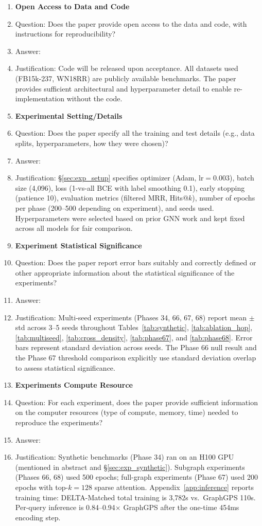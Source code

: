 \documentclass{article}
\begin{document}
\begin{enumerate}
\item {\bf Open Access to Data and Code}
\item[] Question: Does the paper provide open access to the data and code, with instructions for reproducibility?
\item[] Answer: \answerNo{}
\item[] Justification: Code will be released upon acceptance. All datasets used (FB15k-237, WN18RR) are publicly available benchmarks. The paper provides sufficient architectural and hyperparameter detail to enable re-implementation without the code.

\item {\bf Experimental Setting/Details}
\item[] Question: Does the paper specify all the training and test details (e.g., data splits, hyperparameters, how they were chosen)?
\item[] Answer: \answerYes{}
\item[] Justification: \S\ref{sec:exp_setup} specifies optimizer (Adam, $\text{lr}{=}0.003$), batch size (4,096), loss (1-vs-all BCE with label smoothing 0.1), early stopping (patience 10), evaluation metrics (filtered MRR, Hits@$k$), number of epochs per phase (200--500 depending on experiment), and seeds used. Hyperparameters were selected based on prior GNN work and kept fixed across all models for fair comparison.

\item {\bf Experiment Statistical Significance}
\item[] Question: Does the paper report error bars suitably and correctly defined or other appropriate information about the statistical significance of the experiments?
\item[] Answer: \answerYes{}
\item[] Justification: Multi-seed experiments (Phases 34, 66, 67, 68) report mean $\pm$ std across 3--5 seeds throughout Tables~\ref{tab:synthetic}, \ref{tab:ablation_hop}, \ref{tab:multiseed}, \ref{tab:cross_density}, \ref{tab:phase67}, and \ref{tab:phase68}. Error bars represent standard deviation across seeds. The Phase 66 null result and the Phase 67 threshold comparison explicitly use standard deviation overlap to assess statistical significance.

\item {\bf Experiments Compute Resource}
\item[] Question: For each experiment, does the paper provide sufficient information on the computer resources (type of compute, memory, time) needed to reproduce the experiments?
\item[] Answer: \answerYes{}
\item[] Justification: Synthetic benchmarks (Phase 34) ran on an H100 GPU (mentioned in abstract and \S\ref{sec:exp_synthetic}). Subgraph experiments (Phases 66, 68) used 500 epochs; full-graph experiments (Phase 67) used 200 epochs with top-$k{=}128$ sparse attention. Appendix~\ref{app:inference} reports training time: DELTA-Matched total training is 3,782s vs.\ GraphGPS 110s. Per-query inference is 0.84--0.94$\times$ GraphGPS after the one-time 454ms encoding step.


\end{enumerate}
\end{document}
